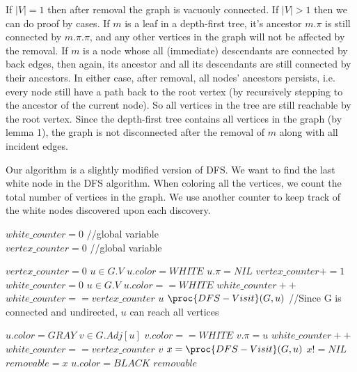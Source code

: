 \documentclass[11pt, answers]{exam}
\theoremstyle{plain}
\theoremstyle{definition}
\begin{document}
\begin{questions}
\begin{solution}
If $|V| = 1$ then after removal the graph is vacuouly connected. If $|V| >1$ then we can do proof by cases. If $m$ is a leaf in a depth-first tree, it's ancestor $m.\pi$ is still connected by $m.\pi.\pi$, and any other vertices in the graph will not be affected by the removal. If $m$ is a node whose all (immediate) descendants are connected by back edges, then again, its ancestor and all its descendants are still connected by their ancestors. In either case, after removal, all nodes' ancestors persists, i.e. every node still have a path back to the root vertex (by recursively stepping to the ancestor of the current node). So all vertices in the tree are still reachable by the root vertex. Since the depth-first tree contains all vertices in the graph (by lemma 1), the graph is not disconnected after the removal of $m$ along with all incident edges.

Our algorithm is a slightly modified version of DFS. We want to find the last white node in the DFS algorithm.
When coloring all the vertices, we count the total number of vertices in the graph. We use another counter to keep track of the white nodes discovered upon each discovery. 

\begin{codebox}
 $white\_counter = 0$ //{global variable} \\
 $vertex\_counter = 0$ //{global variable}
\end{codebox}
\begin{codebox}
\li $vertex\_counter = 0$
\li {} $u \in G.V$ \Do
\li     $u.color = WHITE$
\li     $u.\pi = NIL$
\li     $vertex\_counter += 1$ \End
\li $white\_counter = 0$
\li {} $u \in G.V$ \Do
\li     \If $u.color == WHITE$ \Then 
\li         $white\_counter ++$
\li         \If $white\_counter == vertex\_counter$ \Then
\li             \Return $u$\End
\li         \Return $\proc{DFS-Visit}(G,u)$ //{Since G is connected and undirected, $u$ can reach all vertices}
\End\End
\end{codebox}
\begin{codebox}
\li $u.color =GRAY$
\li {} $v \in G.Adj[u]$ \Do
\li     \If $v.color == WHITE$ \Then
\li         $v.\pi = u$
\li         $white\_counter++$
\li         \If $white\_counter == vertex\_counter$ \Then
\li             \Return $v$
\li         \Else 
\li             $x = \proc{DFS-Visit}(G,u)$
\li             \If $x != NIL$ \Then
\li                 $removable = x$ \End\End\End\End
\li $u.color = BLACK$
\li \Return $removable$
\end{codebox}


\end{solution}
\end{questions}
\end{document}
